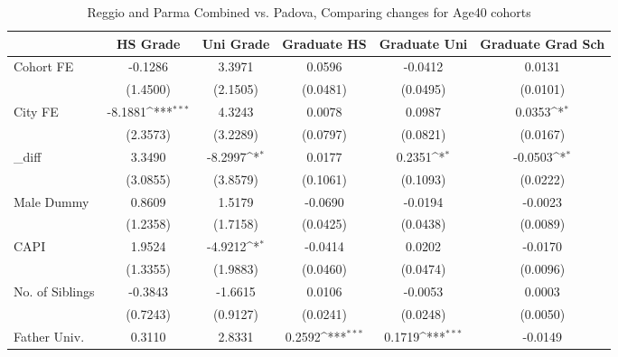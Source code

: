 \begin{table}[htbp]\centering
\def\sym#1{\ifmmode^{#1}\else\(^{#1}\)\fi}
\caption{Reggio and Parma Combined vs. Padova, Comparing changes for Age40 cohorts}
\begin{tabular}{l*{5}{c}}
\toprule
            &\multicolumn{1}{c}{HS Grade}&\multicolumn{1}{c}{Uni Grade}&\multicolumn{1}{c}{Graduate HS}&\multicolumn{1}{c}{Graduate Uni}&\multicolumn{1}{c}{Graduate Grad Sch}\\
\midrule
Cohort FE   &     -0.1286         &      3.3971         &      0.0596         &     -0.0412         &      0.0131         \\
            &    (1.4500)         &    (2.1505)         &    (0.0481)         &    (0.0495)         &    (0.0101)         \\
\addlinespace
City FE     &     -8.1881\sym{***}&      4.3243         &      0.0078         &      0.0987         &      0.0353\sym{*}  \\
            &    (2.3573)         &    (3.2289)         &    (0.0797)         &    (0.0821)         &    (0.0167)         \\
\addlinespace
\_diff       &      3.3490         &     -8.2997\sym{*}  &      0.0177         &      0.2351\sym{*}  &     -0.0503\sym{*}  \\
            &    (3.0855)         &    (3.8579)         &    (0.1061)         &    (0.1093)         &    (0.0222)         \\
\addlinespace
Male Dummy  &      0.8609         &      1.5179         &     -0.0690         &     -0.0194         &     -0.0023         \\
            &    (1.2358)         &    (1.7158)         &    (0.0425)         &    (0.0438)         &    (0.0089)         \\
\addlinespace
CAPI        &      1.9524         &     -4.9212\sym{*}  &     -0.0414         &      0.0202         &     -0.0170         \\
            &    (1.3355)         &    (1.9883)         &    (0.0460)         &    (0.0474)         &    (0.0096)         \\
\addlinespace
No. of Siblings&     -0.3843         &     -1.6615         &      0.0106         &     -0.0053         &      0.0003         \\
            &    (0.7243)         &    (0.9127)         &    (0.0241)         &    (0.0248)         &    (0.0050)         \\
\addlinespace
Father Univ.&      0.3110         &      2.8331         &      0.2592\sym{***}&      0.1719\sym{***}&     -0.0149         \\

\end{tabular}
\end{table}
